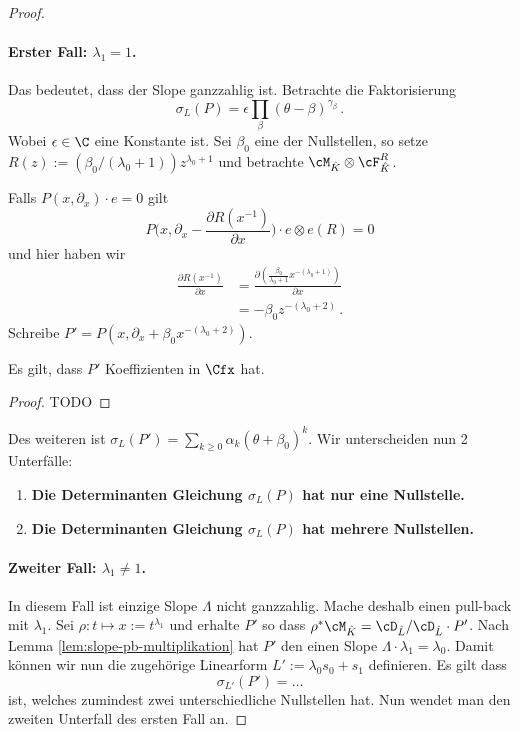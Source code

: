 \begin{proof}
\paragraph{Erster Fall: $\lambda_1=1$.} Das bedeutet, dass der Slope ganzzahlig
ist. Betrachte die Faktorisierung
\[
\sigma_L(P)=\epsilon\prod_{\beta}(\theta-\beta)^{\gamma_\beta}\,.
\]
Wobei $\epsilon\in\C$ eine Konstante ist.  Sei $\beta_0$  eine der Nullstellen,
so setze $R(z):=(\beta_0/(\lambda_0+1))z^{\lambda_0+1}$ und betrachte
$\cM_{\hat K}\otimes \cF_{\hat K}^R$.
\begin{comment}
AB HIER VLT NICHT RICHTIG, nur versuch
\end{comment}
Falls $P(x,\partial_x)\cdot e=0$ gilt
\[
P\Big(x,\partial_x-\frac{\partial R(x^{-1})}{\partial x}\Big)
  \cdot e\otimes e(R)=0
\]
und hier haben wir 
\begin{align*}
\frac{\partial R(x^{-1})}{\partial x} 
  &=\frac{\partial(\frac{\beta_0}{\lambda_0+1}x^{-(\lambda_0+1)})}{\partial
  x}\\
  &=-\beta_0z^{-(\lambda_0+2)} \,.
\end{align*}
Schreibe $P'=P(x,\partial_x+\beta_0x^{-(\lambda_0+2)})$.
\begin{lem}
Es gilt, dass $P'$ Koeffizienten in $\Cfx$ hat.
\end{lem}
\begin{proof}
TODO
\end{proof}
Des weiteren ist $\sigma_L(P')=\sum_{k\geq 0}\alpha_k(\theta+\beta_0)^k$. Wir
unterscheiden nun 2 Unterfälle:
\begin{enumerate}
\item \textbf{Die Determinanten Gleichung $\sigma_L(P)$ hat nur eine
Nullstelle.}
\begin{comment}TODO: Hier weiter \end{comment}
\item \textbf{Die Determinanten Gleichung $\sigma_L(P)$ hat mehrere
Nullstellen.}
\begin{comment}TODO: Hier weiter \end{comment}
\end{enumerate}

\paragraph{Zweiter Fall: $\lambda_1\neq1$.} In diesem Fall ist einzige Slope
$\Lambda$ nicht ganzzahlig. Mache deshalb einen pull-back mit $\lambda_1$. Sei
$\rho:t\mapsto x:=t^{\lambda_1}$ und erhalte $P'$ so dass $\rho^*\cM_{\hat
K}=\cD_{\hat L}/\cD_{\hat L}\cdot P'$.
Nach Lemma \ref{lem:slope-pb-multiplikation} hat $P'$ den einen Slope
$\Lambda\cdot\lambda_1=\lambda_0$.
Damit können wir nun die zugehörige Linearform $L':=\lambda_0s_0+s_1$
definieren. Es gilt dass
\[
\sigma_{L'}(P')=\dots
\]
ist, welches zumindest zwei unterschiedliche Nullstellen hat. Nun wendet man
den zweiten Unterfall des ersten Fall an.

\end{proof} %

